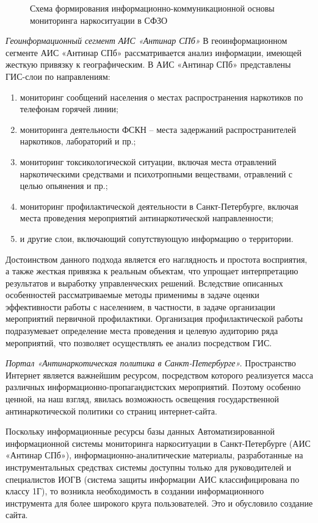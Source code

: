 \begin{figure}
    \caption{Схема формирования информационно-коммуникационной основы
    мониторинга наркоситуации в СФЗО}
    \label{fig:gak_sfzo_monitoring}
\end{figure}

\textit{Геоинформационный сегмент АИС «Антинар СПб»}
В геоинформационном сегменте АИС «Антинар СПб» рассматривается анализ
информации, имеющей жесткую привязку к географическим. В АИС «Антинар
СПб» представлены ГИС-слои по направлениям:
\begin{enumerate}
\item мониторинг сообщений населения о местах распространения наркотиков по
телефонам горячей линии;
\item мониторинга деятельности ФСКН – места задержаний распространителей
наркотиков, лабораторий и пр.;
\item мониторинг токсикологической ситуации, включая места отравлений
наркотическими средствами и психотропными веществами, отравлений с целью
опьянения и пр.;
\item мониторинг профилактической деятельности в Санкт-Петербурге, включая места
проведения мероприятий антинаркотической направленности;
\item и другие слои, включающий сопутствующую информацию о территории.
\end{enumerate}

Достоинством данного подхода является его наглядность и простота восприятия, а
также жесткая привязка к реальным объектам, что упрощает интерпретацию
результатов и выработку управленческих решений. Вследствие описанных
особенностей рассматриваемые методы применимы в задаче оценки эффективности
работы с населением, в частности, в задаче организации мероприятий первичной
профилактики. Организация профилактической работы подразумевает определение
места проведения и целевую аудиторию ряда мероприятий, что позволяет
осуществлять ее анализ посредством ГИС. 

\textit{Портал «Антинаркотическая политика в Санкт-Петербурге».} Пространство
Интернет является важнейшим ресурсом, посредством которого реализуется масса
различных информационно-пропагандистских мероприятий. Поэтому особенно ценной,
на наш взгляд, явилась возможность освещения государственной антинаркотической
политики со страниц интернет-сайта.  

Поскольку информационные ресурсы базы данных Автоматизированной информационной
системы мониторинга наркоситуации в Санкт-Петербурге (АИС «Антинар СПб»),
информационно-аналитические материалы, разработанные на инструментальных
средствах системы доступны только для руководителей и специалистов ИОГВ (система
защиты информации АИС классифицирована по классу 1Г), то возникла необходимость
в создании информационного инструмента для более широкого круга пользователей.
Это и обусловило создание сайта. 

